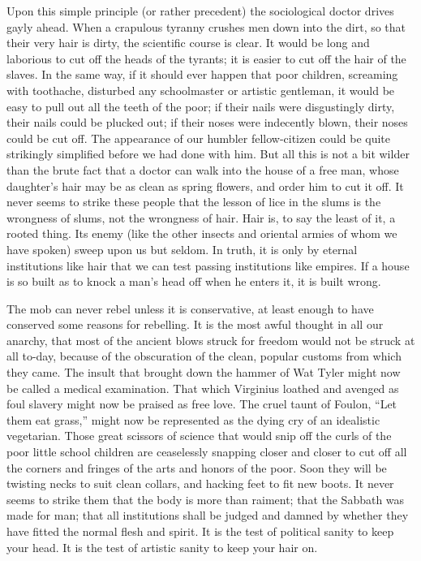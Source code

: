 \documentclass{book}
\begin{document}
Upon this simple principle (or rather precedent) the sociological doctor drives gayly ahead. When a crapulous tyranny crushes men down into the dirt, so that their very hair is dirty, the scientific course is clear. It would be long and laborious to cut off the heads of the tyrants; it is easier to cut off the hair of the slaves. In the same way, if it should ever happen that poor children, screaming with toothache, disturbed any schoolmaster or artistic gentleman, it would be easy to pull out all the teeth of the poor; if their nails were disgustingly dirty, their nails could be plucked out; if their noses were indecently blown, their noses could be cut off. The appearance of our humbler fellow-citizen could be quite strikingly simplified before we had done with him. But all this is not a bit wilder than the brute fact that a doctor can walk into the house of a free man, whose daughter’s hair may be as clean as spring flowers, and order him to cut it off. It never seems to strike these people that the lesson of lice in the slums is the wrongness of slums, not the wrongness of hair. Hair is, to say the least of it, a rooted thing. Its enemy (like the other insects and oriental armies of whom we have spoken) sweep upon us but seldom. In truth, it is only by eternal institutions like hair that we can test passing institutions like empires. If a house is so built as to knock a man’s head off when he enters it, it is built wrong.

The mob can never rebel unless it is conservative, at least enough to have conserved some reasons for rebelling. It is the most awful thought in all our anarchy, that most of the ancient blows struck for freedom would not be struck at all to-day, because of the obscuration of the clean, popular customs from which they came. The insult that brought down the hammer of Wat Tyler might now be called a medical examination. That which Virginius loathed and avenged as foul slavery might now be praised as free love. The cruel taunt of Foulon, “Let them eat grass,” might now be represented as the dying cry of an idealistic vegetarian. Those great scissors of science that would snip off the curls of the poor little school children are ceaselessly snapping closer and closer to cut off all the corners and fringes of the arts and honors of the poor. Soon they will be twisting necks to suit clean collars, and hacking feet to fit new boots. It never seems to strike them that the body is more than raiment; that the Sabbath was made for man; that all institutions shall be judged and damned by whether they have fitted the normal flesh and spirit. It is the test of political sanity to keep your head. It is the test of artistic sanity to keep your hair on.
\end{document}
